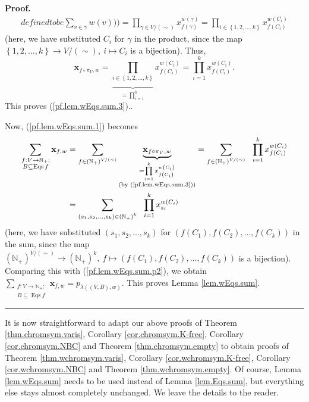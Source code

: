 \documentclass[numbers=enddot,12pt,final,onecolumn,notitlepage]{scrartcl}%
\theoremstyle{definition}
\newenvironment{proof}[1][Proof]{\noindent\textbf{#1.} }{\ \rule{0.5em}{0.5em}}
\newenvironment{verlong}{}{}
\newenvironment{vershort}{}{}
\let\sumnonlimits\sum
\let\prodnonlimits\prod
\renewcommand{\sum}{\sumnonlimits\limits}
\renewcommand{\prod}{\prodnonlimits\limits}
\begin{document}
\begin{verlong}
\begin{proof}
{\begin{align*}
{{{defined to be }\sum_{v\in\gamma}w\left(  v\right)  \text{))}}}=\prod
_{\gamma\in V/\left(  \sim\right)  }x_{f\left(  \gamma\right)  }^{w\left(
\gamma\right)  }=\prod_{i\in\left\{  1,2,\ldots,k\right\}  }x_{f\left(
C_{i}\right)  }^{w\left(  C_{i}\right)  }%
\end{align*}
(here, we have substituted $C_{i}$ for $\gamma$ in the product, since the map
$\left\{  1,2,\ldots,k\right\}  \rightarrow V/\left(  \sim\right)  ,\ i\mapsto
C_{i}$ is a bijection). Thus,%
\[
\mathbf{x}_{f\circ\pi_{V},w}=\underbrace{\prod_{i\in\left\{  1,2,\ldots
,k\right\}  }}_{=\prod_{i=1}^{k}}x_{f\left(  C_{i}\right)  }^{w\left(
C_{i}\right)  }=\prod_{i=1}^{k}x_{f\left(  C_{i}\right)  }^{w\left(
C_{i}\right)  }.
\]
This proves (\ref{pf.lem.wEqs.sum.3}).}.

Now, (\ref{pf.lem.wEqs.sum.1}) becomes%
\begin{align*}
\sum_{\substack{f:V\rightarrow\mathbb{N}_{+};\\B\subseteq\operatorname*{Eqs}%
f}}\mathbf{x}_{f,w}  &  =\sum_{f\in\left(  \mathbb{N}_{+}\right)  ^{V/\left(
\sim\right)  }}\underbrace{\mathbf{x}_{f\circ\pi_{V},w}}_{\substack{=\prod
_{i=1}^{k}x_{f\left(  C_{i}\right)  }^{w\left(  C_{i}\right)  }\\\text{(by
(\ref{pf.lem.wEqs.sum.3}))}}}=\sum_{f\in\left(  \mathbb{N}_{+}\right)
^{V/\left(  \sim\right)  }}\ \ \prod_{i=1}^{k}x_{f\left(  C_{i}\right)
}^{w\left(  C_{i}\right)  }\\
&  =\sum_{\left(  s_{1},s_{2},\ldots,s_{k}\right)  \in\left(  \mathbb{N}%
_{+}\right)  ^{k}}\ \ \prod_{i=1}^{k}x_{s_{i}}^{w\left(  C_{i}\right)  }%
\end{align*}
(here, we have substituted $\left(  s_{1},s_{2},\ldots,s_{k}\right)  $ for
$\left(  f\left(  C_{1}\right)  ,f\left(  C_{2}\right)  ,\ldots,f\left(
C_{k}\right)  \right)  $ in the sum, since the map $\left(  \mathbb{N}%
_{+}\right)  ^{V/\left(  \sim\right)  }\rightarrow\left(  \mathbb{N}%
_{+}\right)  ^{k},\ f\mapsto\left(  f\left(  C_{1}\right)  ,f\left(
C_{2}\right)  ,\ldots,f\left(  C_{k}\right)  \right)  $ is a bijection).
Comparing this with (\ref{pf.lem.wEqs.sum.p2}), we obtain $\sum
_{\substack{f:V\rightarrow\mathbb{N}_{+};\\B\subseteq\operatorname*{Eqs}%
f}}\mathbf{x}_{f,w}=p_{\lambda\left(  \left(  V,B\right)  ,w\right)  }$. This
proves Lemma \ref{lem.wEqs.sum}.
\end{proof}
\end{verlong}

\begin{vershort}
It is now straightforward to adapt our above proofs of Theorem
\ref{thm.chromsym.varis}, Corollary \ref{cor.chromsym.K-free}, Corollary
\ref{cor.chromsym.NBC} and Theorem \ref{thm.chromsym.empty} to obtain proofs
of Theorem \ref{thm.wchromsym.varis}, Corollary \ref{cor.wchromsym.K-free},
Corollary \ref{cor.wchromsym.NBC} and Theorem \ref{thm.wchromsym.empty}. Of
course, Lemma \ref{lem.wEqs.sum} needs to be used instead of Lemma
\ref{lem.Eqs.sum}, but everything else stays almost completely unchanged. We
leave the details to the reader.
\end{vershort}
\end{document}
